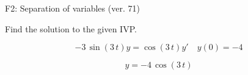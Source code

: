 \begin{exercise}
  \begin{exerciseTitle}F2: Separation of variables (ver. 71)\end{exerciseTitle}
  \begin{exerciseStatement}
    
Find the solution to the given IVP.

    
\[-3 \, \sin\left(3 \, t\right) y= \cos\left(3 \, t\right) y'\hspace{1em} y\left( 0 \right)= -4\]

  \end{exerciseStatement}
  \begin{exerciseAnswer}
    
\[y= -4 \, \cos\left(3 \, t\right)\]

  \end{exerciseAnswer}
\end{exercise}